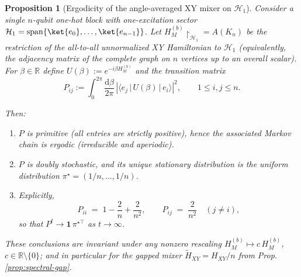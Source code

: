 \documentclass[a4paper,unpublished,onecolumn,11pt]{quantumarticle}
\newtheorem{proposition}[theorem]{Proposition}
\theoremstyle{definition}
\theoremstyle{remark}
\begin{document}
\begin{proposition}[Ergodicity of the angle-averaged XY mixer on $\mathcal H_1$]
\label{prop:xy-ergodicity}
Consider a single $n$-qubit one-hot block with one-excitation sector
$\mathcal H_1=\mathrm{span}\{\ket{e_0},\dots,\ket{e_{n-1}}\}$.
Let $H_{M}^{(b)} \!\upharpoonright_{\mathcal H_1}=A(K_n)$ be the restriction of the all-to-all unnormalized XY Hamiltonian to $\mathcal H_1$ (equivalently, the adjacency matrix of the complete graph on $n$ vertices up to an overall scalar).
For $\beta\in\mathbb R$ define $U(\beta):=e^{-i\beta H_{M}^{(b)} }$ and the transition matrix
\[
P_{ij} := \int_{0}^{2\pi} \frac{\mathrm{d}\beta}{2\pi}\,
\left|\langle e_j \,|\, U(\beta) \,|\, e_i \rangle\right|^{2},
\qquad 1 \le i,j \le n.
\]

Then:
\begin{enumerate}
    \item $P$ is \emph{primitive} (all entries are strictly positive), hence the associated Markov chain is \emph{ergodic} (irreducible and aperiodic).
    \item $P$ is \emph{doubly stochastic}, and its unique stationary distribution is the uniform distribution $\pi^\star=(1/n,\dots,1/n)$.
    \item Explicitly,
    \[
    P_{ii}\;=\;1-\frac{2}{n}+\frac{2}{n^2},
    \qquad
    P_{ij}\;=\;\frac{2}{n^2}\quad (j\neq i),
    \]
    so that $P^t\to \mathbf 1\,\pi^{\star\!\top}$ as $t\to\infty$.
\end{enumerate}
These conclusions are invariant under any nonzero rescaling $H_{M}^{(b)} \mapsto c\,H_{M}^{(b)} $, $c\in\mathbb R\setminus\{0\}$; and in particular for the gapped mixer \(   \widetilde H_{XY}=H_{XY}/n\)
from Prop. \ref{prop:spectral-gap}.
\end{proposition}



\end{document}
